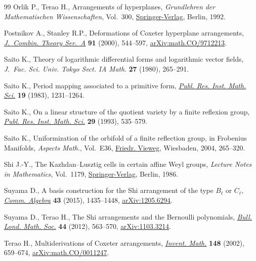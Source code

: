 \begin{thebibliography}{99}
Orlik P., Terao H., Arrangements of hyperplanes, \textit{Grundlehren der
 Mathematischen Wissenschaften}, Vol.~300, \href{https://doi.org/10.1007/978-3-662-02772-1}{Springer-Verlag}, Berlin, 1992.

Postnikov A., Stanley R.P., Deformations of {C}oxeter hyperplane arrangements,
 \href{https://doi.org/10.1006/jcta.2000.3106}{\textit{J.~Combin. Theory Ser.~A}} \textbf{91} (2000), 544--597,
 \href{https://arxiv.org/abs/math.CO/9712213}{arXiv:math.CO/9712213}.

Saito K., Theory of logarithmic differential forms and logarithmic vector
 fields, \textit{J.~Fac. Sci. Univ. Tokyo Sect. IA Math.} \textbf{27} (1980),
 265--291.

Saito K., Period mapping associated to a primitive form, \href{https://doi.org/10.2977/prims/1195182028}{\textit{Publ. Res.
 Inst. Math. Sci.}} \textbf{19} (1983), 1231--1264.

Saito K., On a linear structure of the quotient variety by a finite reflexion
 group, \href{https://doi.org/10.2977/prims/1195166742}{\textit{Publ. Res. Inst. Math. Sci.}} \textbf{29} (1993), 535--579.

Saito K., Uniformization of the orbifold of a finite reflection group, in
 Frobenius Manifolds, \textit{Aspects Math.}, Vol.~E36, \href{https://doi.org/10.1007/978-3-322-80236-1_11}{Friedr. Vieweg},
 Wiesbaden, 2004, 265--320.

Shi J.-Y., The {K}azhdan--{L}usztig cells in certain affine {W}eyl groups,
 \textit{Lecture Notes in Mathematics}, Vol.~1179, \href{https://doi.org/10.1007/BFb0074968}{Springer-Verlag}, Berlin,
 1986.

Suyama D., A basis construction for the {S}hi arrangement of the type
 {$B_\ell$} or {$C_\ell$}, \href{https://doi.org/10.1080/00927872.2013.865051}{\textit{Comm. Algebra}} \textbf{43} (2015),
 1435--1448, \href{https://arxiv.org/abs/1205.6294}{arXiv:1205.6294}.

Suyama D., Terao H., The {S}hi arrangements and the {B}ernoulli polynomials,
 \href{https://doi.org/10.1112/blms/bdr118}{\textit{Bull. Lond. Math. Soc.}} \textbf{44} (2012), 563--570,
 \href{https://arxiv.org/abs/1103.3214}{arXiv:1103.3214}.

Terao H., Multiderivations of {C}oxeter arrangements, \href{https://doi.org/10.1007/s002220100209}{\textit{Invent. Math.}}
 \textbf{148} (2002), 659--674, \href{https://arxiv.org/abs/math.CO/0011247}{arXiv:math.CO/0011247}.


\end{thebibliography}
